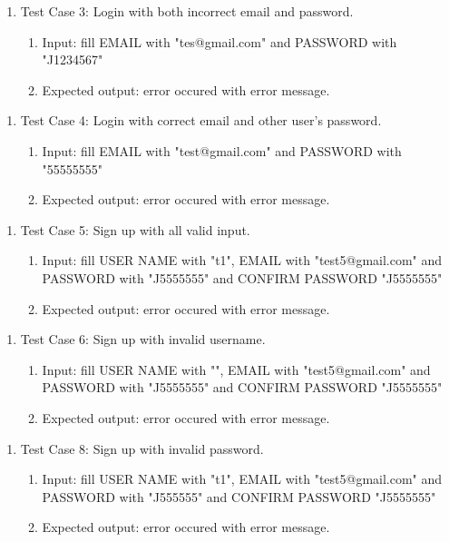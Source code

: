 \documentclass[11pt]{article}
\begin{document}
    \begin{enumerate}
        \item Test Case 3: Login with both incorrect email and password.
        \begin{enumerate}
            \item  Input: fill EMAIL with "tes@gmail.com" and PASSWORD with "J1234567"
            \item  Expected output: error occured with error message.
        \end{enumerate}
    \end{enumerate}
    \begin{enumerate}
        \item Test Case 4: Login with correct email and other user's password.
        \begin{enumerate}
            \item  Input: fill EMAIL with "test@gmail.com" and PASSWORD with "55555555"
            \item  Expected output: error occured with error message.
        \end{enumerate}
    \end{enumerate}
    \begin{enumerate}
        \item Test Case 5: Sign up with all valid input.
        \begin{enumerate}
            \item  Input: fill USER NAME with "t1", EMAIL with "test5@gmail.com" and PASSWORD with "J5555555" and CONFIRM PASSWORD "J5555555"
            \item  Expected output: error occured with error message.
        \end{enumerate}
    \end{enumerate}
    \begin{enumerate}
        \item Test Case 6: Sign up with invalid username.
        \begin{enumerate}
            \item  Input: fill USER NAME with "", EMAIL with "test5@gmail.com" and PASSWORD with "J5555555" and CONFIRM PASSWORD "J5555555"
            \item  Expected output: error occured with error message.
        \end{enumerate}
    \end{enumerate}
    \begin{enumerate}
        \item Test Case 8: Sign up with invalid password.
        \begin{enumerate}
            \item  Input: fill USER NAME with "t1", EMAIL with "test5@gmail.com" and PASSWORD with "J555555" and CONFIRM PASSWORD "J5555555"
            \item  Expected output: error occured with error message.
        \end{enumerate}
    \end{enumerate}
\end{document}
